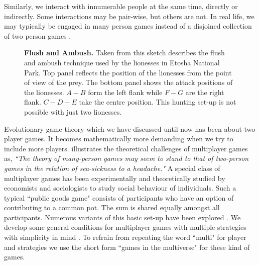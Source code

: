 \documentclass[oneside,11pt,a4paper]{book}
\begin{document}
Similarly, we interact with innumerable people at the same time, directly or indirectly. 
Some interactions may be pair-wise, but others are not.
In real life, we may typically be engaged in many person games instead of a disjoined collection of two person games \citep{hamilton:1975aa}.
%
\begin{figure}[h]
  \begin{center}
    \leavevmode
    \caption{\textbf{Flush and Ambush.}
    \small{Taken from \citet{stander:1992aa} this sketch describes the flush and ambush technique used by the lionesses in Etosha National Park.
    Top panel reflects the position of the lionesses from the point of view of the prey.
    The bottom panel shows the attack positions of the lionesses. $A-B$ form the left flank while $F-G$ are the right flank.
    $C-D-E$ take the centre position. This hunting set-up is not possible with just two lionesses.}
    }
    \label{fig:stander}
  \end{center}
\end{figure}
%
Evolutionary game theory which we have discussed until now has been about two player games.
It becomes mathematically more demanding when we try to include more players.
\citet{hamilton:1975aa} illustrates the theoretical challenges of multiplayer games as, 
\textit{``The theory of many-person games may seem to stand to that of two-person games in the relation of sea-sickness to a headache."}
A special class of multiplayer games has been experimentally and theoretically studied by economists and sociologists to study social behaviour of individuals.
Such a typical ``public goods game" consists of participants who have an option of contributing to a common pot.
The sum is shared equally amongst all participants. 
Numerous variants of this basic set-up have been explored \citep{wedekind:2000gw,milinski:2001og,anderson:2001aa,hauert:2002te,semmann:2003he,milinski:2006aa,rockenbach:2006aa,hauert:2007aa,milinski:2008lr,santos:2008xr,pacheco:2009aa,souza:2009aa,veelen:2009ma,traulsen:2010pn,connor:2010aa}.
We develop some general conditions for multiplayer games with multiple strategies with simplicity in mind \citep{kurokawa:2009aa,gokhale:2010pn}.
To refrain from repeating the word ``multi" for player and strategies we use the short form ``games in the multiverse" for these kind of games.
\end{document}
